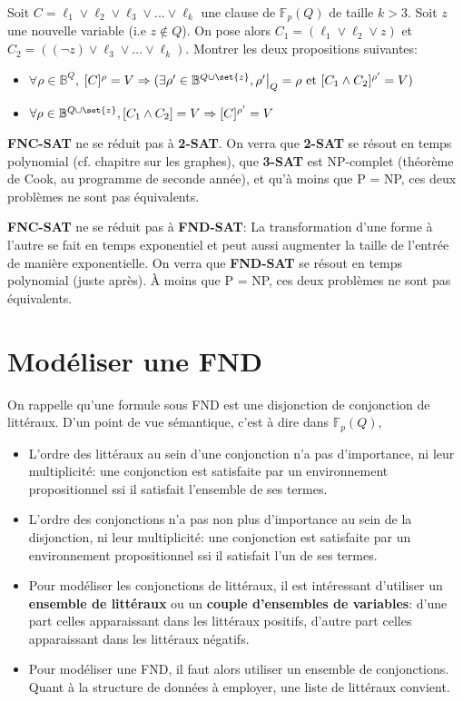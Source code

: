 \documentclass{scrartcl}
\newcommand{\fpq}{\mathbb{F}_p(Q)}
\begin{document}
		\exo Soit $C = \ell_1 \vee \ell_2 \vee \ell_3 \vee ... \vee \ell_k$ une clause de $\fpq$ de taille $k > 3$.
		Soit $z$ une nouvelle variable (i.e $z \not\in Q$). 
		On pose alors $C_1 = (\ell_1 \vee \ell_2 \vee z)$ et $C_2 = ((\neg z) \vee \ell_3 \vee ... \vee \ell_k)$.
		Montrer les deux propositions suivantes:
		\begin{itemize}
			\item $\forall \rho \in \mathbb{B}^Q$, $[C]^\rho = V \Rightarrow 
				(\exists \rho' \in \mathbb{B}^{Q\cup\set{z}}, \rho'\big|_Q = \rho \text{ et } [C_1\wedge C_2]^{\rho'} = V)$
			\item $\forall \rho \in \mathbb{B}^{Q\cup\set{z}}, [C_1\wedge C_2] = V \Rightarrow [C]^{\rho'} = V$
		\end{itemize}

		\rem \textbf{FNC-SAT} ne se réduit pas à \textbf{2-SAT}. 
		On verra que \textbf{2-SAT} se résout en temps polynomial (cf. chapitre sur les graphes), 
		que \textbf{3-SAT} est NP-complet (théorème de Cook, au programme de seconde année),
		et qu'à moins que P = NP, ces deux problèmes ne sont pas équivalents.

		\rem \textbf{FNC-SAT} ne se réduit pas à \textbf{FND-SAT}:
		La transformation d'une forme à l'autre se fait en temps exponentiel et peut aussi augmenter la taille de l'entrée de manière exponentielle.
		On verra que \textbf{FND-SAT} se résout en temps polynomial (juste après).
		À moins que P = NP, ces deux problèmes ne sont pas équivalents.

	\section{Modéliser une FND}
		On rappelle qu'une formule sous FND est une disjonction de conjonction de littéraux. D'un point de vue sémantique, c'est à dire dans $\fpq$,
		\begin{itemize}
			\item L'ordre des littéraux au sein d'une conjonction n'a pas d'importance, ni leur multiplicité:
				une conjonction est satisfaite par un environnement propositionnel ssi il satisfait l’ensemble de ses termes.
			\item L'ordre des conjonctions n'a pas non plus d'importance au sein de la disjonction, ni leur multiplicité:
				une conjonction est satisfaite par un environnement propositionnel ssi il satisfait l'un de ses termes.
			\item Pour modéliser les conjonctions de littéraux, il est intéressant d'utiliser un \textbf{ensemble de littéraux} ou un \textbf{couple d'ensembles de variables}:
				d'une part celles apparaissant dans les littéraux positifs, d'autre part celles apparaissant dans les littéraux négatifs.
			\item Pour modéliser une FND, il faut alors utiliser un ensemble de conjonctions. 
				Quant à la structure de données à employer, une liste de littéraux convient.
		\end{itemize}
	
\end{document}
